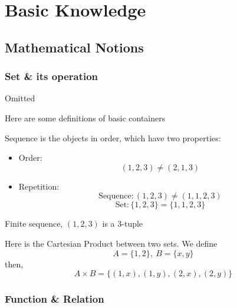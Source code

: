 \chapter{Basic Knowledge}

\section{Mathematical Notions}

\subsection{Set \& its operation}

\begin{definition}[Set]
    Omitted    
\end{definition}

\begin{definition*}
Here are some definitions of basic containers

\begin{definition}[Sequence]
    Sequence is the objects in order, which have two properties:
    \begin{itemize}
        \item Order: \[
        (1, 2, 3) \neq (2, 1, 3)
        \]
        \item Repetition: \[
        \text{Sequence}:(1, 2, 3) \neq (1, 1, 2,3)
        \]
        \[
        \text{Set}: \{1, 2, 3\} = \{1, 1, 2, 3\}
        \]
    \end{itemize}
\end{definition}

\begin{definition}[Tuple]
    Finite sequence, \((1, 2, 3)\) is a 3-tuple
\end{definition}
    
\end{definition*}

\begin{definition}
    Here is the Cartesian Product between two sets. We define
    \[
    A = \{1, 2\}, \ B = \{x, y\}
    \]
    then,
    \[
    A \times B = \{(1, x),(1, y),(2, x),(2, y)\}
    \]
\end{definition}

\newpage

\subsection{Function \& Relation}

